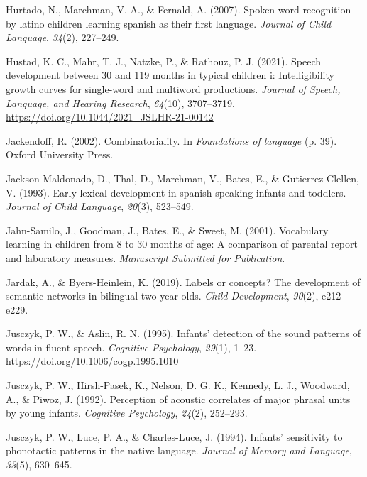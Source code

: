 \documentclass[
  12pt,
  b5paperpaper,
  twoside]{scrreprt}
\newlength{\cslhangindent}
\newlength{\cslentryspacingunit} %
\newenvironment{CSLReferences}[2] %
 {%
  \setlength{\parindent}{0pt}
  \ifodd #1
  \let\oldpar\par
  \def\par{\hangindent=\cslhangindent\oldpar}
  \fi
  \setlength{\parskip}{#2\cslentryspacingunit}
 }%
 {}
\begin{document}
\begin{CSLReferences}{1}{0}
\leavevmode{}%
Hurtado, N., Marchman, V. A., \& Fernald, A. (2007). Spoken word
recognition by latino children learning spanish as their first language.
\emph{Journal of Child Language}, \emph{34}(2), 227--249.

\leavevmode{}%
Hustad, K. C., Mahr, T. J., Natzke, P., \& Rathouz, P. J. (2021). Speech
development between 30 and 119 months in typical children i:
Intelligibility growth curves for single-word and multiword productions.
\emph{Journal of Speech, Language, and Hearing Research}, \emph{64}(10),
3707--3719. \url{https://doi.org/10.1044/2021_JSLHR-21-00142}

\leavevmode{}%
Jackendoff, R. (2002). Combinatoriality. In \emph{Foundations of
language} (p. 39). Oxford University Press.

\leavevmode{}%
Jackson-Maldonado, D., Thal, D., Marchman, V., Bates, E., \&
Gutierrez-Clellen, V. (1993). Early lexical development in
spanish-speaking infants and toddlers. \emph{Journal of Child Language},
\emph{20}(3), 523--549.

\leavevmode{}%
Jahn-Samilo, J., Goodman, J., Bates, E., \& Sweet, M. (2001). Vocabulary
learning in children from 8 to 30 months of age: A comparison of
parental report and laboratory measures. \emph{Manuscript Submitted for
Publication}.

\leavevmode{}%
Jardak, A., \& Byers-Heinlein, K. (2019). Labels or concepts? The
development of semantic networks in bilingual two-year-olds. \emph{Child
Development}, \emph{90}(2), e212--e229.

\leavevmode{}%
Jusczyk, P. W., \& Aslin, R. N. (1995). Infants' detection of the sound
patterns of words in fluent speech. \emph{Cognitive Psychology},
\emph{29}(1), 1--23. \url{https://doi.org/10.1006/cogp.1995.1010}

\leavevmode{}%
Jusczyk, P. W., Hirsh-Pasek, K., Nelson, D. G. K., Kennedy, L. J.,
Woodward, A., \& Piwoz, J. (1992). Perception of acoustic correlates of
major phrasal units by young infants. \emph{Cognitive Psychology},
\emph{24}(2), 252--293.

\leavevmode{}%
Jusczyk, P. W., Luce, P. A., \& Charles-Luce, J. (1994). Infants'
sensitivity to phonotactic patterns in the native language.
\emph{Journal of Memory and Language}, \emph{33}(5), 630--645.


\end{CSLReferences}
\end{document}
